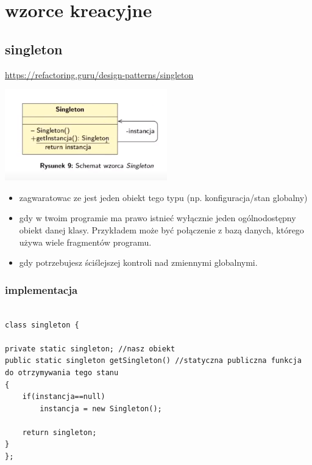 \documentclass[11pt]{article}
\begin{document}
\section{wzorce kreacyjne}
\label{sec:org983d88d}
\subsection{singleton}
\label{sec:orgd732e75}
\url{https://refactoring.guru/design-patterns/singleton}

\begin{center}
\includegraphics[width=.9\linewidth]{./singleton.png}
\end{center}
\begin{itemize}
\item zagwaratowac ze jest jeden obiekt tego typu (np. konfiguracja/stan globalny)
\item gdy w twoim programie ma prawo istnieć wyłącznie jeden ogólnodostępny obiekt danej klasy. Przykładem może być połączenie z bazą danych, którego używa wiele fragmentów programu.
\item gdy potrzebujesz ściślejszej kontroli nad zmiennymi globalnymi.
\end{itemize}
\subsubsection{implementacja}
\label{sec:org9dd03e8}
\begin{verbatim}

class singleton {

private static singleton; //nasz obiekt
public static singleton getSingleton() //statyczna publiczna funkcja do otrzymywania tego stanu
{
	if(instancja==null)
		instancja = new Singleton();

	return singleton;
}
};

\end{verbatim}
\end{document}
